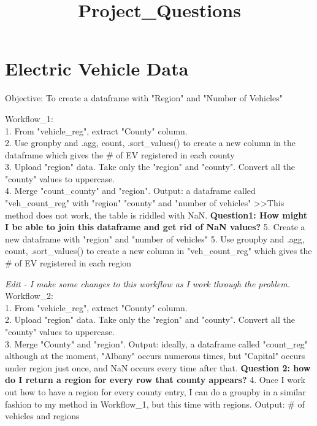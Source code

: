 \documentclass[11pt]{article}
\title{Project\_Questions}
\begin{document}
    
    
    \maketitle
    
    

    
    \section{Electric Vehicle Data}\label{electric-vehicle-data}

Objective: To create a dataframe with "Region" and "Number of Vehicles"

Workflow\_1:\\
1. From "vehicle\_reg", extract "County" column.\\
2. Use groupby and .agg, count, .sort\_values() to create a new column
in the dataframe which gives the \# of EV registered in each county\\
3. Upload "region" data. Take only the "region" and "county". Convert
all the "county" values to uppercase.\\
4. Merge "count\_county" and "region". Output: a dataframe called
"veh\_count\_reg" with "region" "county" and "number of vehicles"
\textgreater{}\textgreater{}This method does not work, the table is
riddled with NaN. \textbf{Question1: How might I be able to join this
dataframe and get rid of NaN values?} 5. Create a new dataframe with
"region" and "number of vehicles" 5. Use groupby and .agg, count,
.sort\_values() to create a new column in "veh\_count\_reg" which gives
the \# of EV registered in each region

\emph{Edit - I make some changes to this workflow as I work through the
problem.}\\
Workflow\_2:\\
1. From "vehicle\_reg", extract "County" column.\\
2. Upload "region" data. Take only the "region" and "county". Convert
all the "county" values to uppercase.\\
3. Merge "County" and "region". Output: ideally, a dataframe called
"count\_reg" although at the moment, "Albany" occurs numerous times, but
"Capital" occurs under region just once, and NaN occurs every time after
that. \textbf{Question 2: how do I return a region for every row that
county appears?} 4. Once I work out how to have a region for every
county entry, I can do a groupby in a similar fashion to my method in
Workflow\_1, but this time with regions. Output: \# of vehicles and
regions
\end{document}
